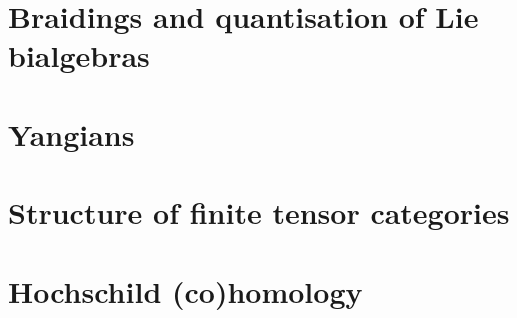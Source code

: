         \chapter{Braidings and quantisation of Lie bialgebras}
            \begin{abstract}
            
            \end{abstract}
            
            \minitoc
        
            

        \chapter{Yangians}
            \begin{abstract}
            
            \end{abstract}
            
            \minitoc
    
        \begin{appendices}
            \chapter{Structure of finite tensor categories}
                \begin{abstract}
                
                \end{abstract}
                
                \minitoc
            
                
                
                
    
            \chapter{Hochschild (co)homology}
                \begin{abstract}
                
                \end{abstract}
                
                \minitoc
                
        \end{appendices}
	
    \printbibliography

